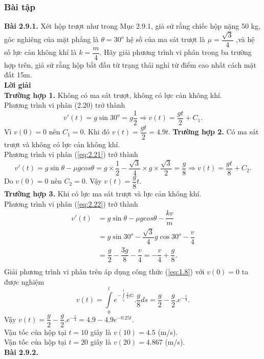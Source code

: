 \subsubsection{Bài tập}
\noindent\textbf{Bài 2.9.1.} Xét hộp trượt như trong Mục 2.9.1, giả sử rằng chiếc hộp nặng 50 kg, góc nghiêng của mặt phẳng là $\theta ={{30}^{o}}$ hệ số của ma sát trượt là $\mu =\dfrac{\sqrt{3}}{4}$ ,và hệ số lực cản không khí là $k=\dfrac{m}{4}$. Hãy giải phương trình vi phân trong ba trường hợp trên, giả sử rằng hộp bắt đầu từ trạng thái nghỉ từ điểm cao nhất cách mặt đất 15m.\\
\textbf{Lời giải}\\
\textbf{Trường hợp 1.}  Không có ma sát trượt, không có lực cản không khí.\\
Phương trình vi phân (2.20) trở thành
$$v'(t)=g\sin {{30}^{o}}=g\dfrac{1}{2}\Rightarrow v(t)=\dfrac{gt}{2}+{{C}_{1}}.$$
Vì $v(0)=0 $ nên ${{C}_{1}}=0$. Khi đó $v(t)=\dfrac{gt}{2}=4.9t$.\newpage
\noindent\textbf{Trường hợp 2.} Có ma sát trượt và không có lực cản không khí.\\
Phương trình vi phân (\ref{eq:2.21}) trở thành
$$v'(t)=g\sin \theta -\mu gcos\theta =g\times \dfrac{1}{2}-\dfrac{\sqrt{3}}{4}\times g\times \dfrac{\sqrt{3}}{2}=\dfrac{g}{8}\Rightarrow v(t)=\dfrac{gt}{8}+{{C}_{2}}.$$
Do $v(0)=0$ nên ${{C}_{2}}=0$. Vậy $v(t)=\dfrac{g}{8}t$.\\
\textbf{Trường hợp 3.}  Khi có lực ma sát trượt và lực cản không khí.\\
Phương trình vi phân (\ref{eq:2.22}) trở thành
$$\begin{array}{ll}
	 v'(t)&=g\sin \theta -\mu gcos\theta -\dfrac{kv}{m}\,\,\, \\ 
	 &=g\sin {{30}^{o}}-\dfrac{\sqrt{3}}{4}g\cos {{30}^{o}}-\dfrac{v}{4} \\ 
	 &=\dfrac{g}{2}-\dfrac{3g}{8}-\dfrac{v}{4}=-\dfrac{v}{4}+\dfrac{g}{8}. \\ 
\end{array}$$
Giải phương trình vi phân trên áp dụng công thức (\ref{eq:1.8}) với $v(0)=0$ ta được nghiệm $$v(t)=\int\limits_{0}^{t}{{{e}^{-\int\limits_{s}^{t}{\frac{1}{4}dz}}}.\dfrac{g}{8}ds}=\dfrac{g}{2}-\dfrac{g}{2}.{{e}^{-\frac{t}{4}}}.$$
Vậy $v(t)=\dfrac{g}{2}-\dfrac{g}{2}.{{e}^{-\frac{t}{4}}}=4.9-4.9{{e}^{-0.25t}}.$ \\
Vận tốc của hộp tại $t=10$ giây là $v(10)=4.5 $ (m/s).\\
Vận tốc của hộp tại $t=20$ giây là $v(20)=4.867$ (m/s).\\ 
\noindent\textbf{Bài 2.9.2. }\\
